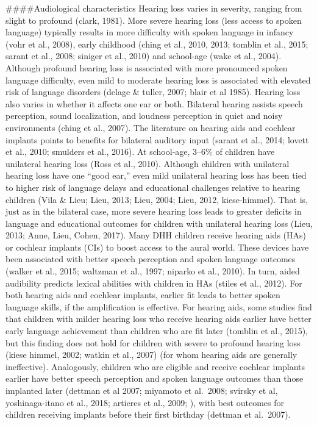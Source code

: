 \documentclass[
]{article}
\begin{document}
\#\#\#\#Audiological characteristics Hearing loss varies in severity,
ranging from slight to profound (clark, 1981). More severe hearing loss
(less access to spoken language) typically results in more difficulty
with spoken language in infancy (vohr et al., 2008), early childhood
(ching et al., 2010, 2013; tomblin et al., 2015; sarant et al., 2008;
siniger et al., 2010) and school-age (wake et al., 2004). Although
profound hearing loss is associated with more pronounced spoken language
difficulty, even mild to moderate hearing loss is associated with
elevated risk of language disorders (delage \& tuller, 2007; blair et al
1985). Hearing loss also varies in whether it affects one ear or both.
Bilateral hearing assists speech perception, sound localization, and
loudness perception in quiet and noisy environments (ching et al.,
2007). The literature on hearing aids and cochlear implants points to
benefits for bilateral auditory input (sarant et al., 2014; lovett et
al., 2010; smulders et al., 2016). At school-age, 3--6\% of children
have unilateral hearing loss (Ross et al., 2010). Although children with
unilateral hearing loss have one ``good ear,'' even mild unilateral
hearing loss has been tied to higher risk of language delays and
educational challenges relative to hearing children (Vila \& Lieu; Lieu,
2013; Lieu, 2004; Lieu, 2012, kiese-himmel). That is, just as in the
bilateral case, more severe hearing loss leads to greater deficits in
language and educational outcomes for children with unilateral hearing
loss (Lieu, 2013; Anne, Lieu, Cohen, 2017). Many DHH children receive
hearing aids (HAs) or cochlear implants (CIs) to boost access to the
aural world. These devices have been associated with better speech
perception and spoken language outcomes (walker et al., 2015; waltzman
et al., 1997; niparko et al., 2010). In turn, aided audibility predicts
lexical abilities with children in HAs (stiles et al., 2012). For both
hearing aids and cochlear implants, earlier fit leads to better spoken
language skills, if the amplification is effective. For hearing aids,
some studies find that children with milder hearing loss who receive
hearing aids earlier have better early language achievement than
children who are fit later (tomblin et al., 2015), but this finding does
not hold for children with severe to profound hearing loss (kiese
himmel, 2002; watkin et al., 2007) (for whom hearing aids are generally
ineffective). Analogously, children who are eligible and receive
cochlear implants earlier have better speech perception and spoken
language outcomes than those implanted later (dettman et al 2007;
miyamoto et al.~2008; svirsky et al, yoshinaga-itano et al., 2018;
artieres et al., 2009; ), with best outcomes for children receiving
implants before their first birthday (dettman et al.~2007).
\end{document}
